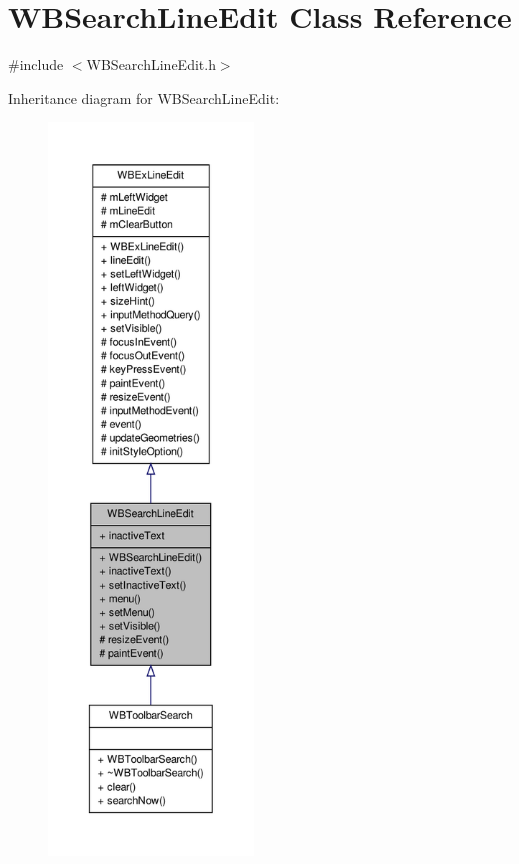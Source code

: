 \hypertarget{class_w_b_search_line_edit}{\section{W\-B\-Search\-Line\-Edit Class Reference}
\label{dd/d7f/class_w_b_search_line_edit}
}


{\ttfamily \#include $<$W\-B\-Search\-Line\-Edit.\-h$>$}



Inheritance diagram for W\-B\-Search\-Line\-Edit\-:
\nopagebreak
\begin{figure}[H]
\begin{center}
\leavevmode
\includegraphics[height=550pt]{dc/dee/class_w_b_search_line_edit__inherit__graph}
\end{center}
\end{figure}


